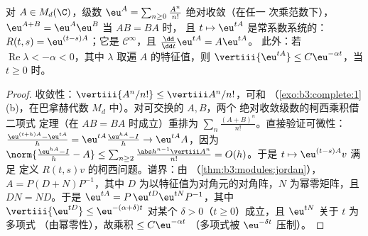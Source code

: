 \begin{theorem}[矩阵指数]\label{thm:b3:ode:matrixexp}
对 $A \in M_d(\C)$，级数 $\eu^{A} =
\sum_{n\geq0}\frac{A^n}{n!}$ 绝对收敛（在任一
次乘范数下），$\eu^{A+B} = \eu^A\eu^B$ 当 $AB = BA$ 时，
且 $t \mapsto \eu^{tA}$ 是常系数系统的：
$R(t,s) = \eu^{(t-s)A}$；它是 $\mathcal
C^\infty$，且 $\frac{\dd}{\dd t}\eu^{tA} = A\eu^{tA}$。
此外：若 $\operatorname{Re}\lambda < -\alpha < 0$，其中 $\lambda$ 取遍
$A$ 的特征值，则 $\vertiii{\eu^{tA}}
\leq C\eu^{-\alpha t}$，当 $t \geq 0$ 时。
\end{theorem}

\begin{proof}
收敛性：$\vertiii{A^n/n!} \leq \vertiii A^n/n!$，可和
（\cref{exo:b3:complete:1}(b)，在巴拿赫代数
$M_d$ 中）。对可交换的 $A, B$，两个
绝对收敛级数的柯西乘积借二项式
定理（在 $AB = BA$ 时成立）重排为
$\sum_n\frac{(A+B)^n}{n!}$。直接验证可微性：
$\frac{\eu^{(t+h)A} - \eu^{tA}}h = \eu^{tA}\frac{\eu^{hA} -
I}{h} \to \eu^{tA}A$，因为 $\norm{\frac{\eu^{hA} - I}h - A}
\leq \sum_{n\geq2}\frac{\abs h^{n-1}\vertiii A^n}{n!} =
O(h)$。于是 $t \mapsto \eu^{(t - s)A}v$ 满足
定义 $R(t,s)v$ 的柯西问题。谱界：由
（\cref{thm:b3:modules:jordan}），$A = P(D + N)P^{-1}$，其中 $D$
为以特征值为对角元的对角阵，$N$ 为幂零矩阵，且 $DN =
ND$。于是 $\eu^{tA} = P\,\eu^{tD}\eu^{tN}P^{-1}$，其中
$\vertiii{\eu^{tD}} \leq \eu^{-(\alpha + \delta)t}$ 对某个
$\delta > 0$（$t \geq 0$）成立，且 $\eu^{tN}$ 关于 $t$ 为多项式
（由幂零性），故乘积 $\leq C\eu^{-\alpha t}$
（多项式被 $\eu^{-\delta t}$ 压制）。
\end{proof}

